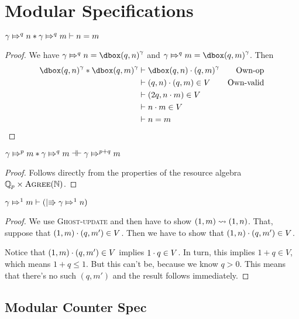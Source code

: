 \section{Modular Specifications}
\label{section:modular-specs}

\begin{lemma}
$\apointsto{\gamma}{n}{q} * \apointsto{\gamma}{m}{q} \vdash n = m$
\end{lemma}

\begin{proof}
We have $\apointsto{\gamma}{n}{q} = \ownr{(q, n)}{\gamma}$ and $\apointsto{\gamma}{m}{q} = \ownr{(q, m)}{\gamma}$. Then
\begin{align*}
\ownr{(q, n)}{\gamma} * \ownr{(q, m)}{\gamma} & \vdash \ownr{\prodelem{(q, n)}{(q, m)}}{\gamma} & \text{Own-op}\\
& \vdash \prodelem{(q, n)}{(q, m)} \in V & \text{Own-valid} \\
& \vdash (2q, \prodelem{n}{m}) \in V &\\
& \vdash \prodelem{n}{m} \in V & \\
& \vdash n = m 
\end{align*}
\end{proof}

\begin{lemma}
$\apointsto{\gamma}{m}{p} * \apointsto{\gamma}{m}{q} \dashv \vdash \apointsto{\gamma}{m}{p + q}$
\end{lemma}
\begin{proof}
Follows directly from the properties of the resource algebra $\fracra \times \agra{\natra}$.
\end{proof}

\begin{lemma}
$\apointsto{\gamma}{m}{1} \vdash (\upmod{\apointsto{\gamma}{n}{1}})$
\end{lemma}

\begin{proof}
We use \textsc{Ghost-update} and then have to show $\fpupd{(1, m)}{(1,n)}$.  That, suppose that $\prodelem{(1, m)}{(q, m')} \in V$. Then we have to show that $\prodelem{(1, n)}{(q, m')} \in V$.

Notice that $\prodelem{(1, m)}{(q, m')} \in V$ implies $\prodelem{1}{q} \in V$. In turn, this implies $1 + q \in V$, which means $1 + q \le 1$. But this can't be, because we know $q > 0$. This means that there's no such $(q, m')$ and the result follows immediately.
\end{proof}

\subsection{Modular Counter Spec}

